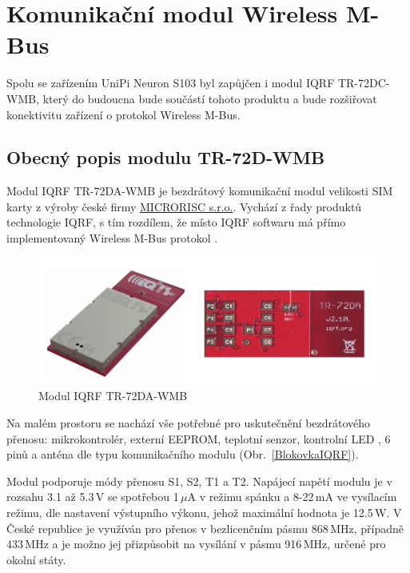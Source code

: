 \chapter{Komunikační modul Wireless M-Bus}

Spolu se zařízením UniPi Neuron S103 byl zapůjčen i modul IQRF TR-72DC-WMB, který do budoucna bude součástí tohoto produktu a bude rozšiřovat konektivitu zařízení o protokol Wireless M-Bus. 

\section{Obecný popis modulu TR-72D-WMB}

Modul IQRF TR-72DA-WMB je bezdrátový komunikační modul velikosti SIM karty z výroby české firmy \href{http://microrisc.com/cs/}{MICRORISC s.r.o.}. Vychází z řady produktů technologie IQRF, s tím rozdílem, že místo IQRF softwaru má přímo implementovaný Wireless M-Bus protokol \cite{ModulIQRF}. 

 \begin{figure}[!ht]
  \begin{center}
    \includegraphics[scale=0.6]{obrazky/modul_modul}
  \end{center}
  \caption{Modul IQRF TR-72DA-WMB \cite{ModulIQRF}}
\end{figure}

Na malém prostoru se nachází vše potřebné pro uskutečnění bezdrátového přenosu: mikrokontrolér, externí EEPROM, teplotní senzor, kontrolní LED , 6 pinů a anténa dle typu komunikačního modulu (Obr.~\ref{BlokovkaIQRF}).



Modul podporuje módy přenosu S1, S2, T1 a T2. Napájecí napětí modulu je v rozsahu 3.1 až 5.3\,V se spotřebou 1\,$\mu$A v režimu spánku a 8-22\,mA ve vysílacím režimu, dle nastavení výstupního výkonu, jehož maximální hodnota je 12.5\,W.
V České republice je využíván pro přenos v bezlicenčním pásmu 868\,MHz, případně 433\,MHz a je možno jej přizpůsobit na vysílání v pásmu 916\,MHz, určené pro okolní státy.\newline


